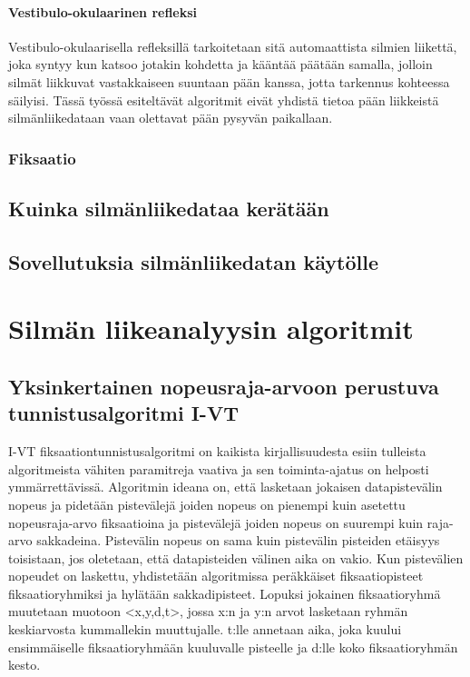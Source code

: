 \paragraph{Vestibulo-okulaarinen refleksi}
Vestibulo-okulaarisella refleksillä tarkoitetaan sitä automaattista silmien liikettä, joka syntyy kun katsoo jotakin kohdetta ja kääntää päätään samalla, jolloin silmät liikkuvat vastakkaiseen suuntaan pään kanssa, jotta tarkennus kohteessa säilyisi.\citep[s.210]{laurutis1986vestibulo} Tässä työssä esiteltävät algoritmit eivät yhdistä tietoa pään liikkeistä silmänliikedataan vaan olettavat pään pysyvän paikallaan.

\subsubsection{Fiksaatio}

\subsection{Kuinka silmänliikedataa kerätään}

\subsection{Sovellutuksia silmänliikedatan käytölle}


\section{Silmän liikeanalyysin algoritmit}
\subsection{Yksinkertainen nopeusraja-arvoon perustuva tunnistusalgoritmi I-VT}
I-VT fiksaationtunnistusalgoritmi on kaikista kirjallisuudesta esiin tulleista algoritmeista vähiten paramitreja vaativa ja sen toiminta-ajatus on helposti ymmärrettävissä. Algoritmin ideana on, että lasketaan jokaisen datapistevälin nopeus ja pidetään pistevälejä joiden nopeus on pienempi kuin asetettu nopeusraja-arvo fiksaatioina ja pistevälejä joiden nopeus on suurempi kuin raja-arvo sakkadeina. Pistevälin nopeus on sama kuin pistevälin pisteiden etäisyys toisistaan, jos oletetaan, että datapisteiden välinen aika on vakio. Kun pistevälien nopeudet on laskettu, yhdistetään algoritmissa peräkkäiset fiksaatiopisteet fiksaatioryhmiksi ja hylätään sakkadipisteet. Lopuksi jokainen fiksaatioryhmä muutetaan muotoon <x,y,d,t>, jossa x:n ja y:n arvot lasketaan ryhmän keskiarvosta kummallekin muuttujalle. t:lle annetaan aika, joka kuului ensimmäiselle fiksaatioryhmään kuuluvalle pisteelle ja d:lle koko fiksaatioryhmän kesto. \citep[s. 73]{salvucci2000}

